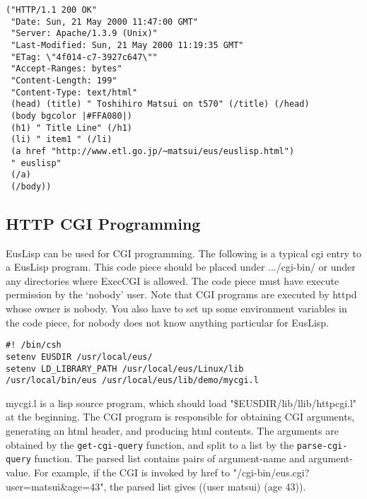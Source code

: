 \begin{refdesc}
\begin{verbatim}
("HTTP/1.1 200 OK"
 "Date: Sun, 21 May 2000 11:47:00 GMT"
 "Server: Apache/1.3.9 (Unix)"
 "Last-Modified: Sun, 21 May 2000 11:19:35 GMT"
 "ETag: \"4f014-c7-3927c647\""
 "Accept-Ranges: bytes"
 "Content-Length: 199"
 "Content-Type: text/html"
 (head) (title) " Toshihiro Matsui on t570" (/title) (/head)
 (body bgcolor |#FFA080|)
 (h1) " Title Line" (/h1)
 (li) " item1 " (/li)
 (a href "http://www.etl.go.jp/~matsui/eus/euslisp.html")
 " euslisp"
 (/a)
 (/body))
\end{verbatim}



\end{refdesc}

\subsection{HTTP CGI Programming}

EusLisp can be used for  CGI programming.
The following is a typical cgi entry to a EusLisp program.
This code piece should be placed under .../cgi-bin/ or under
any directories where ExecCGI is allowed.  The code piece
must have execute permission by the `nobody' user.
Note that CGI programs are executed by httpd whose owner is
nobody. You also have to set up some environment variables in the
code piece, for nobody does not know anything particular for EusLisp.

\begin{verbatim}
#! /bin/csh
setenv EUSDIR /usr/local/eus/
setenv LD_LIBRARY_PATH /usr/local/eus/Linux/lib
/usr/local/bin/eus /usr/local/eus/lib/demo/mycgi.l
\end{verbatim}

mycgi.l is a lisp source program, which should load
"\$EUSDIR/lib/llib/httpcgi.l" at the beginning.
The CGI program is responsible for obtaining CGI arguments,
generating an html header, and producing html contents.
The arguments are obtained by the {\tt get-cgi-query} function,
and split to a list by the {\tt parse-cgi-query} function.
The parsed list contains pairs of argument-name and argument-value.
For example, if the CGI is invoked by href to
"/cgi-bin/eus.cgi?user=matsui\&age=43",
the parsed list gives ((user matsui) (age 43)).

